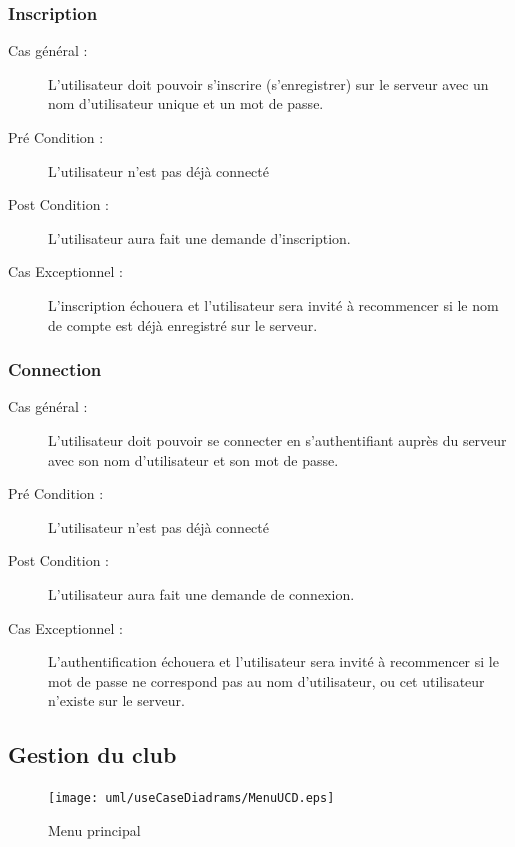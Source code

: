 \documentclass[a4paper]{report}
\begin{document}
\subsubsection{Inscription}

\begin{description}
    \item[Cas général  :] L'\gls{utilisateur} doit pouvoir s'inscrire (s'enregistrer) sur le \gls{serveur} avec un nom d'\gls{utilisateur} unique et un mot de passe.
    \item[Pré Condition  :] L'\gls{utilisateur} n'est pas déjà connecté
    \item[Post Condition :] L'\gls{utilisateur} aura fait une demande d'inscription.
    \item[Cas Exceptionnel :] L'inscription échouera et l'\gls{utilisateur} sera invité à recommencer si le nom de compte est déjà enregistré sur le \gls{serveur}.
\end{description}

\subsubsection{Connection}
\begin{description}
    \item[Cas général :] L'\gls{utilisateur} doit pouvoir se connecter en s'authentifiant auprès du \gls{serveur} avec son nom d'\gls{utilisateur} et son mot de passe.
    \item[Pré Condition  :] L'\gls{utilisateur} n'est pas déjà connecté
    \item[Post Condition :] L'\gls{utilisateur} aura fait une demande de connexion.
    \item[Cas Exceptionnel :] L'authentification échouera et l'\gls{utilisateur} sera invité à recommencer si le mot de passe ne correspond pas au nom d'\gls{utilisateur}, ou cet \gls{utilisateur} n'existe sur le \gls{serveur}.
\end{description}

\subsection{Gestion du club}


\begin{figure}[H]
    \begin{center}
        \texttt{[image: uml/useCaseDiadrams/MenuUCD.eps]}
        \caption{Menu principal}
    \end{center}
\end{figure}
\end{document}
